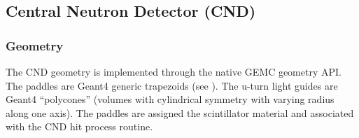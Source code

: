 \subsection{Central Neutron Detector (CND)}

\subsubsection{Geometry}

The CND geometry is implemented through the native GEMC geometry API.
The paddles are Geant4 generic trapezoids (see ). The u-turn light guides are Geant4 ``polycones''
(volumes with cylindrical symmetry with varying radius along one axis).
The paddles are assigned the scintillator material and associated with the CND hit process routine.

